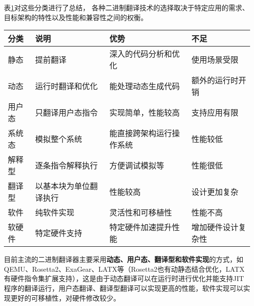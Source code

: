 表\ref{tab:BTs}对这些分类进行了总结，
各种二进制翻译技术的选择取决于特定应用的需求、目标架构的特性以及性能和兼容性之间的权衡。

\begin{table}[!htbp]
  \label{tab:BTs}
\centering
\footnotesize%
\setlength{\tabcolsep}{4pt}%
\renewcommand{\arraystretch}{1.2}%
  \begin{tabular}{llll}
  \hline
  分类  & 说明                  & 优势           & 不足                  \\ \hline
  静态  & 提前翻译                & 深入的代码分析和优化   & 使用场景受限  \\
  动态  & 运行时翻译和优化            & 能处理动态生成代码    & 额外的运行时开销    \\
  \hline
  用户态 & 只翻译用户态指令            & 实现简单，性能较高    & 支持应用有限     \\
  系统态 &  模拟整个系统 & 能直接跨架构运行操作系统 & 性能较低                \\
  \hline
  解释型 & 逐条指令解释执行            & 方便调试模拟等      & 性能很低 \\
  翻译型 & 以基本块为单位翻译执行       & 性能较高         & 设计更加复杂              \\
  \hline
  软件  & 纯软件实现               & 灵活性和可移植性     & 性能不高                \\
  软硬件 & 特定硬件支持    & 特定硬件加速提升性能   & 增加硬件设计复杂性      \\ \hline   
  \end{tabular}
  \end{table}

目前主流的二进制翻译器主要采用\textbf{动态、用户态、翻译型和软件实现}的方式，如QEMU\cite{bellardQEMUFastPortable2005}、Rosetta2\cite{RosettaTranslationEnvironment, RunningIntelBinaries}、ExaGear\cite{KunPengExaGear}、LATX\cite{LoongArchEnv2022, LoongArch2023}等（Rosetta2也有动静态结合优化，LATX有硬件指令集扩展支持），这是由于动态翻译可以在运行时进行优化并能支持JIT程序的翻译运行，用户态翻译、翻译型翻译可以实现更高的性能，软件实现可以实现更好的可移植性，对硬件修改较少。




